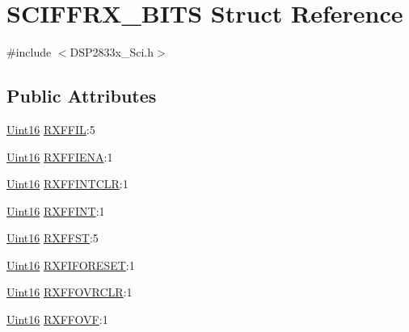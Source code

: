 \hypertarget{struct_s_c_i_f_f_r_x___b_i_t_s}{}\section{S\+C\+I\+F\+F\+R\+X\+\_\+\+B\+I\+T\+S Struct Reference}
\label{struct_s_c_i_f_f_r_x___b_i_t_s}


{\ttfamily \#include $<$D\+S\+P2833x\+\_\+\+Sci.\+h$>$}

\subsection*{Public Attributes}
\begin{DoxyCompactItemize}
\item 
\hyperlink{_d_s_p2833x___device_8h_a59a9f6be4562c327cbfb4f7e8e18f08b}{Uint16} \hyperlink{struct_s_c_i_f_f_r_x___b_i_t_s_aa60e481ac2ef54f12fb4f7a9bc593a31}{R\+X\+F\+F\+I\+L}\+:5
\item 
\hyperlink{_d_s_p2833x___device_8h_a59a9f6be4562c327cbfb4f7e8e18f08b}{Uint16} \hyperlink{struct_s_c_i_f_f_r_x___b_i_t_s_ae38e80f9a664244eb6ad93296edc8b0f}{R\+X\+F\+F\+I\+E\+N\+A}\+:1
\item 
\hyperlink{_d_s_p2833x___device_8h_a59a9f6be4562c327cbfb4f7e8e18f08b}{Uint16} \hyperlink{struct_s_c_i_f_f_r_x___b_i_t_s_a8e99a9cfd20fd40b5580bfc22a2b17a4}{R\+X\+F\+F\+I\+N\+T\+C\+L\+R}\+:1
\item 
\hyperlink{_d_s_p2833x___device_8h_a59a9f6be4562c327cbfb4f7e8e18f08b}{Uint16} \hyperlink{struct_s_c_i_f_f_r_x___b_i_t_s_aa97a9fb1430f936f8653de0f73a31cb5}{R\+X\+F\+F\+I\+N\+T}\+:1
\item 
\hyperlink{_d_s_p2833x___device_8h_a59a9f6be4562c327cbfb4f7e8e18f08b}{Uint16} \hyperlink{struct_s_c_i_f_f_r_x___b_i_t_s_a93b059775a44a47fffc957d51483504f}{R\+X\+F\+F\+S\+T}\+:5
\item 
\hyperlink{_d_s_p2833x___device_8h_a59a9f6be4562c327cbfb4f7e8e18f08b}{Uint16} \hyperlink{struct_s_c_i_f_f_r_x___b_i_t_s_a7d1d1dbf7c40ada7de65f9a06f8f3f51}{R\+X\+F\+I\+F\+O\+R\+E\+S\+E\+T}\+:1
\item 
\hyperlink{_d_s_p2833x___device_8h_a59a9f6be4562c327cbfb4f7e8e18f08b}{Uint16} \hyperlink{struct_s_c_i_f_f_r_x___b_i_t_s_affe11c779bce6ee64d76075a8a9f6a79}{R\+X\+F\+F\+O\+V\+R\+C\+L\+R}\+:1
\item 
\hyperlink{_d_s_p2833x___device_8h_a59a9f6be4562c327cbfb4f7e8e18f08b}{Uint16} \hyperlink{struct_s_c_i_f_f_r_x___b_i_t_s_aae121f19b02db2864a6d2b56deea5041}{R\+X\+F\+F\+O\+V\+F}\+:1
\end{DoxyCompactItemize}


